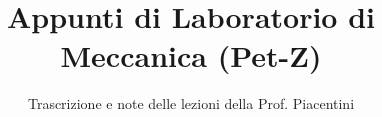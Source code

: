 \documentclass[a4paper,12pt]{article}
\title{Appunti di Laboratorio di Meccanica (Pet-Z)}
\author{Trascrizione e note delle lezioni della Prof. Piacentini}
\date{}
\begin{document}
\maketitle
\projectintro
\tableofcontents
\newpage

\end{document}
